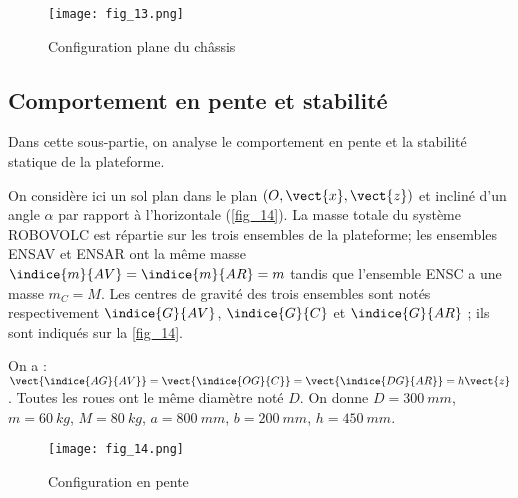 \begin{figure}[H]
\centering
\texttt{[image: fig\_13.png]}
\caption{Configuration plane du châssis\label{fig_13}}
\end{figure}
\fi

\subsection{Comportement en pente et stabilité}
\begin{obj}
Dans cette sous-partie, on analyse le comportement en pente et la stabilité statique de la
plateforme.
\end{obj}


\ifprof
\else

On considère ici un sol plan dans le plan $\left(O,\vect{x},\vect{z}\right)$ et incliné d'un angle $\alpha$ par rapport à
l'horizontale (\autoref{fig_14}). La masse totale du système ROBOVOLC est répartie sur les trois
ensembles de la plateforme; les ensembles ENSAV et ENSAR ont la même masse
$\indice{m}{AV}=\indice{m}{AR}=m$ tandis que l'ensemble ENSC a une masse $m_C=M$. Les centres de gravité des
trois ensembles sont notés respectivement $\indice{G}{AV}$, $\indice{G}{C}$ et $\indice{G}{AR}$ ; ils sont indiqués sur la \autoref{fig_14}.

On a : $\vect{\indice{AG}{AV}}=\vect{\indice{OG}{C}}=\vect{\indice{DG}{AR}}=h\vect{z}$. 
Toutes les roues ont le même diamètre noté $D$.
On donne $D =\SI{300}{mm}$, $m =\SI{60}{kg}$, $M =\SI{80}{kg}$, $a =\SI{800}{mm}$, $b =\SI{200}{mm}$, $h =\SI{450}{mm}$.


\begin{figure}[H]
\centering
\texttt{[image: fig\_14.png]}
\caption{Configuration en pente \label{fig_14}}
\end{figure}
\fi

\ifprof
\begin{corrige}
\end{corrige}
\else
\fi

\ifprof
\begin{corrige}
\end{corrige}
\else
\fi


